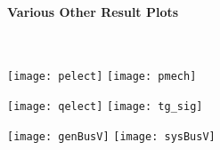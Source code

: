 \documentclass[12pt]{article}
\begin{document}
\paragraph{Various Other Result Plots} \ \\
\begin{center}
\texttt{[image: pelect]} %
\texttt{[image: pmech]}

\texttt{[image: qelect]} %
\texttt{[image: tg\_sig]}


\texttt{[image: genBusV]} %
\texttt{[image: sysBusV]} 
\end{center}
\end{document}
